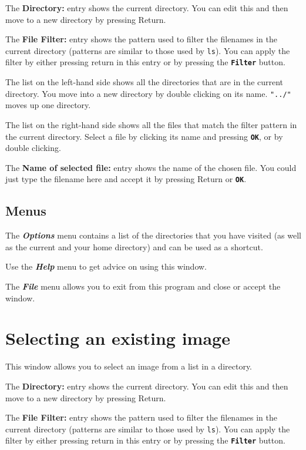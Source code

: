 \documentclass[11pt,nolof]{starlink}
\providecommand{\butt}[1]{{\bf \tt #1}}
\providecommand{\menu}[1]{{\bf \em #1}}
\providecommand{\wlab}[1]{{\bf #1}}
\providecommand{\text}[1]{{\tt #1}}
\begin{document}
The \wlab{Directory:} entry shows the current directory. You can edit this
and then move to a new directory by pressing Return.

The \wlab{File Filter:} entry shows the pattern used to filter the
filenames in the current directory (patterns are similar to those used
by \text{ls}). You can apply the filter by either pressing return in
this entry or by pressing the \butt{Filter} button.

The list on the left-hand side shows all the directories that are in
the current directory. You move into a new directory by double
clicking on its name. \text{"../"} moves up one directory.

The list on the right-hand side shows all the files that match the filter
pattern in the current directory. Select a file by clicking its name and
pressing \butt{OK}, or by double clicking.

The \wlab{Name of selected file:} entry shows the name of the chosen file.
You could just type the filename here and accept it by pressing Return or
\butt{OK}.

\subsection{Menus }

The \menu{Options} menu contains a list of the directories that you
have visited (as well as the current and your home directory) and can
be used as a shortcut.

Use the \menu{Help} menu to get advice on using this window.

The \menu{File} menu allows you to exit from this program and close or
accept the window.

\section{Selecting an existing image }
This window allows you to select an image from a list in a directory.

The \wlab{Directory:} entry shows the current directory. You can edit this
and then move to a new directory by pressing Return.

The \wlab{File Filter:} entry shows the pattern used to filter the
filenames in the current directory (patterns are similar to those used
by \text{ls}). You can apply the filter by either pressing return in
this entry or by pressing the \butt{Filter} button.
\end{document}
